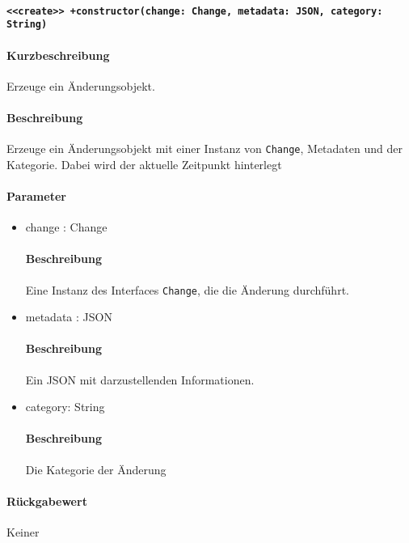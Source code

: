 \paragraph{\texttt{<<create>> +constructor(change: Change, metadata: JSON, category: String)}}%
\paragraph*{Kurzbeschreibung}
Erzeuge ein Änderungsobjekt.
\paragraph*{Beschreibung}
Erzeuge ein Änderungsobjekt mit einer Instanz von \verb#Change#, Metadaten und der Kategorie.
Dabei wird der aktuelle Zeitpunkt hinterlegt
\paragraph*{Parameter}
\begin{itemize}
    \item change : Change
            \paragraph*{Beschreibung}
            Eine Instanz des Interfaces \verb#Change#, die die Änderung durchführt.
    \item metadata : JSON
            \paragraph*{Beschreibung}
            Ein JSON mit darzustellenden Informationen.
    \item category: String
            \paragraph*{Beschreibung}
            Die Kategorie der Änderung
\end{itemize}
\paragraph*{Rückgabewert}
Keiner
